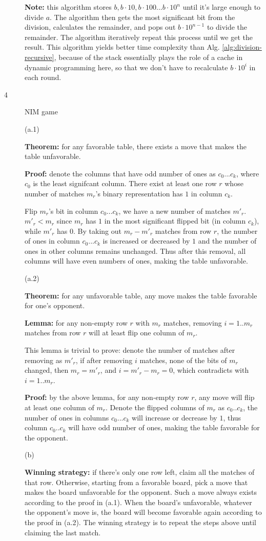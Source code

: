\documentclass{article}
\begin{document}
\begin{description}
  \textbf{Note:} this algorithm stores $b, b \cdot 10, b \cdot 100...b \cdot 10^n$ until it's large enough to divide $a$. The algorithm then gets the most significant bit from the division, calculates the remainder, and pops out $b \cdot 10^{n-1}$ to divide the remainder. The algorithm iteratively repeat this process until we get the result. This algorithm yields better time complexity than Alg. \ref{alg:division-recursive}, because of the stack essentially plays the role of a cache in dynamic programming here, so that we don't have to recalculate $b \cdot 10^i$ in each round.

\item[4]{NIM game}

  (a.1) 

  \textbf{Theorem:} for any favorable table, there exists a move that makes the table unfavorable.

  \textbf{Proof:} denote the columns that have odd number of ones as $c_0...c_k$, where $c_0$ is the least signifcant column. There exist at least one row $r$ whose number of matches $m_r$'s binary representation has $1$ in column $c_k$.

  Flip $m_r$'s bit in column $c_0...c_k$, we have a new number of matches $m'_r$. $m'_r < m_r$ since $m_r$ has $1$ in the most significant flipped bit (in column $c_k$), while $m'_r$ has $0$. By taking out $m_r - m'_r$ matches from row $r$, the number of ones in column $c_0...c_k$ is increased or decreased by $1$ and the number of ones in other columns remains unchanged. Thus after this removal, all columns will have even numbers of ones, making the table unfavorable.

  (a.2) 

  \textbf{Theorem:} for any unfavorable table, any move makes the table favorable for one’s opponent.

  \textbf{Lemma:} for any non-empty row $r$ with $m_r$ matches, removing $i=1..m_r$ matches from row $r$ will at least flip one column of $m_r$. 

  This lemma is trivial to prove: denote the number of matches after removing as $m'_r$, if after removing $i$ matches, none of the bits of $m_r$ changed, then $m_r = m'_r$, and $i = m'_r - m_r = 0$, which contradicts with $i=1..m_r$.

  \textbf{Proof:} by the above lemma, for any non-empty row $r$, any move will flip at least one column of $m_r$. Denote the flipped columns of $m_r$ as $c_0..c_k$, the number of ones in columns $c_0...c_k$ will increase or decrease by $1$, thus column $c_0..c_k$ will have odd number of ones, making the table favorable for the opponent.

  (b) 

  \textbf{Winning strategy:} if there's only one row left, claim all the matches of that row. Otherwise, starting from a favorable board, pick a move that makes the board unfavorable for the opponent. Such a move always exists according to the proof in (a.1). When the board's unfavorable, whatever the opponent's move is, the board will become favorable again according to the proof in (a.2). The winning strategy is to repeat the steps above until claiming the last match.

\end{description}
\end{document}
